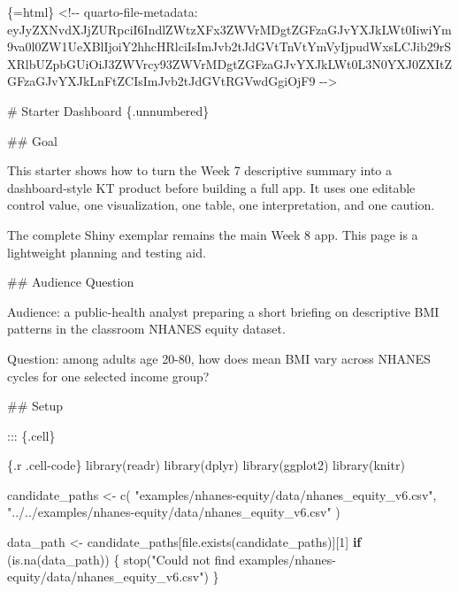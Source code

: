\documentclass[
  letterpaper,
  DIV=11,
  numbers=noendperiod,
  oneside]{scrreprt}
\newenvironment{Shaded}{\begin{snugshade}}{\end{snugshade}}
\newcommand{\ControlFlowTok}[1]{\textcolor[rgb]{0.00,0.23,0.31}{\textbf{#1}}}
\newcommand{\DecValTok}[1]{\textcolor[rgb]{0.68,0.00,0.00}{#1}}
\newcommand{\FunctionTok}[1]{\textcolor[rgb]{0.28,0.35,0.67}{#1}}
\newcommand{\InformationTok}[1]{\textcolor[rgb]{0.37,0.37,0.37}{#1}}
\newcommand{\NormalTok}[1]{\textcolor[rgb]{0.00,0.23,0.31}{#1}}
\newcommand{\OtherTok}[1]{\textcolor[rgb]{0.00,0.23,0.31}{#1}}
\newcommand{\StringTok}[1]{\textcolor[rgb]{0.13,0.47,0.30}{#1}}
\begin{document}
\begin{Shaded}
\begin{Highlighting}[numbers=left,,]
\InformationTok{\textasciigrave{}\textasciigrave{}\textasciigrave{}\{=html\}}
\InformationTok{\textless{}!{-}{-} quarto{-}file{-}metadata: eyJyZXNvdXJjZURpciI6IndlZWtzXFx3ZWVrMDgtZGFzaGJvYXJkLWt0IiwiYm9va0l0ZW1UeXBlIjoiY2hhcHRlciIsImJvb2tJdGVtTnVtYmVyIjpudWxsLCJib29rSXRlbUZpbGUiOiJ3ZWVrcy93ZWVrMDgtZGFzaGJvYXJkLWt0L3N0YXJ0ZXItZGFzaGJvYXJkLnFtZCIsImJvb2tJdGVtRGVwdGgiOjF9 {-}{-}\textgreater{}}
\InformationTok{\textasciigrave{}\textasciigrave{}\textasciigrave{}}

\FunctionTok{\# Starter Dashboard \{.unnumbered\}}


\FunctionTok{\#\# Goal}

\NormalTok{This starter shows how to turn the Week 7 descriptive summary into a dashboard{-}style KT product before building a full app. It uses one editable control value, one visualization, one table, one interpretation, and one caution.}

\NormalTok{The complete Shiny exemplar remains the main Week 8 app. This page is a lightweight planning and testing aid.}

\FunctionTok{\#\# Audience Question}

\NormalTok{Audience: a public{-}health analyst preparing a short briefing on descriptive BMI patterns in the classroom NHANES equity dataset.}

\NormalTok{Question: among adults age 20{-}80, how does mean BMI vary across NHANES cycles for one selected income group?}

\FunctionTok{\#\# Setup}


\NormalTok{::: \{.cell\}}

\InformationTok{\textasciigrave{}\textasciigrave{}\textasciigrave{}\{.r .cell{-}code\}}
\FunctionTok{library}\NormalTok{(readr)}
\FunctionTok{library}\NormalTok{(dplyr)}
\FunctionTok{library}\NormalTok{(ggplot2)}
\FunctionTok{library}\NormalTok{(knitr)}

\NormalTok{candidate\_paths }\OtherTok{\textless{}{-}} \FunctionTok{c}\NormalTok{(}
  \StringTok{"examples/nhanes{-}equity/data/nhanes\_equity\_v6.csv"}\NormalTok{,}
  \StringTok{"../../examples/nhanes{-}equity/data/nhanes\_equity\_v6.csv"}
\NormalTok{)}

\NormalTok{data\_path }\OtherTok{\textless{}{-}}\NormalTok{ candidate\_paths[}\FunctionTok{file.exists}\NormalTok{(candidate\_paths)][}\DecValTok{1}\NormalTok{]}
\ControlFlowTok{if}\NormalTok{ (}\FunctionTok{is.na}\NormalTok{(data\_path)) \{}
  \FunctionTok{stop}\NormalTok{(}\StringTok{"Could not find examples/nhanes{-}equity/data/nhanes\_equity\_v6.csv"}\NormalTok{)}
\NormalTok{\}}


\end{Highlighting}
\end{Shaded}
\end{document}
